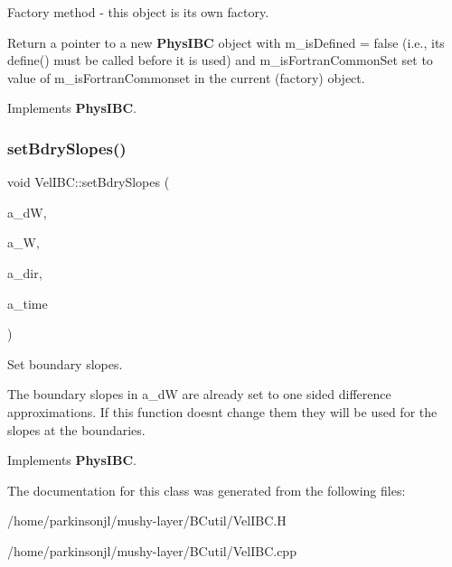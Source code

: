 Factory method -\/ this object is its own factory. 

Return a pointer to a new \textbf{ Phys\+I\+BC} object with m\+\_\+is\+Defined = false (i.\+e., its define() must be called before it is used) and m\+\_\+is\+Fortran\+Common\+Set set to value of m\+\_\+is\+Fortran\+Commonset in the current (factory) object. 

Implements \textbf{ Phys\+I\+BC}.

\mbox{\label{class_vel_i_b_c_a39ac3b18e885c749a1081ba7042941df}} 
\subsubsection{\texorpdfstring{set\+Bdry\+Slopes()}{setBdrySlopes()}}
{\footnotesize\ttfamily void Vel\+I\+B\+C\+::set\+Bdry\+Slopes (\begin{DoxyParamCaption}\item[{\textbf{ F\+Array\+Box} \&}]{a\+\_\+dW,  }\item[{const \textbf{ F\+Array\+Box} \&}]{a\+\_\+W,  }\item[{const int \&}]{a\+\_\+dir,  }\item[{const \textbf{ Real} \&}]{a\+\_\+time }\end{DoxyParamCaption})\hspace{0.3cm}{\ttfamily [virtual]}}



Set boundary slopes. 

The boundary slopes in a\+\_\+dW are already set to one sided difference approximations. If this function doesn\textquotesingle{}t change them they will be used for the slopes at the boundaries. 

Implements \textbf{ Phys\+I\+BC}.



The documentation for this class was generated from the following files\+:\begin{DoxyCompactItemize}
\item 
/home/parkinsonjl/mushy-\/layer/\+B\+Cutil/Vel\+I\+B\+C.\+H\item 
/home/parkinsonjl/mushy-\/layer/\+B\+Cutil/Vel\+I\+B\+C.\+cpp\end{DoxyCompactItemize}
